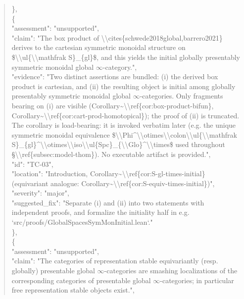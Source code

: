\documentclass[11pt]{article}
\begin{document}
\begin{quote}
    \},\\
    \{\\
      "assessment": "unsupported",\\
      "claim": "The box product of \textbackslash{}\textbackslash{}cites\{schwede2018global,barrero2021\} derives to the cartesian symmetric monoidal structure on \$\textbackslash{}\textbackslash{}ul\{\textbackslash{}\textbackslash{}mathfrak S\}\_\{gl\}\$, and this yields the initial globally presentably symmetric monoidal global \ensuremath{\infty}-category.",\\
      "evidence": "Two distinct assertions are bundled: (i) the derived box product is cartesian, and (ii) the resulting object is initial among globally presentably symmetric monoidal global \ensuremath{\infty}-categories. Only fragments bearing on (i) are visible (Corollary\~{}\textbackslash{}\textbackslash{}ref\{cor:box-product-bifun\}, Corollary\~{}\textbackslash{}\textbackslash{}ref\{cor:cart-prod-homotopical\}); the proof of (ii) is truncated. The corollary is load-bearing: it is invoked verbatim later (e.g. the unique symmetric monoidal equivalence \$\textbackslash{}\textbackslash{}Phi\^{}\textbackslash{}\textbackslash{}otimes\textbackslash{}\textbackslash{}colon\textbackslash{}\textbackslash{}ul\{\textbackslash{}\textbackslash{}mathfrak S\}\_\{gl\}\^{}\textbackslash{}\textbackslash{}otimes\textbackslash{}\textbackslash{}iso\textbackslash{}\textbackslash{}ul\{Spc\}\_\{\textbackslash{}\textbackslash{}Glo\}\^{}\textbackslash{}\textbackslash{}times\$ used throughout §\textbackslash{}\textbackslash{}ref\{subsec:model-thom\}). No executable artifact is provided.",\\
      "id": "TC-03",\\
      "location": "Introduction, Corollary\~{}\textbackslash{}\textbackslash{}ref\{cor:S-gl-times-initial\} (equivariant analogue: Corollary\~{}\textbackslash{}\textbackslash{}ref\{cor:S-equiv-times-initial\})",\\
      "severity": "major",\\
      "suggested\_fix": "Separate (i) and (ii) into two statements with independent proofs, and formalize the initiality half in e.g. `src/proofs/GlobalSpacesSymMonInitial.lean`."\\
    \},\\
    \{\\
      "assessment": "unsupported",\\
      "claim": "The categories of representation stable equivariantly (resp. globally) presentable global \ensuremath{\infty}-categories are smashing localizations of the corresponding categories of presentable global \ensuremath{\infty}-categories; in particular free representation stable objects exist.",\\

\end{quote}
\end{document}

